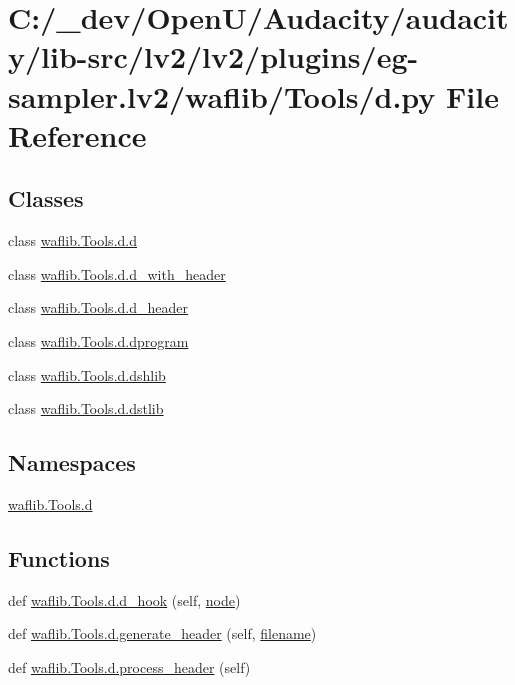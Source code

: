 \hypertarget{lv2_2plugins_2eg-sampler_8lv2_2waflib_2_tools_2d_8py}{}\section{C\+:/\+\_\+dev/\+Open\+U/\+Audacity/audacity/lib-\/src/lv2/lv2/plugins/eg-\/sampler.lv2/waflib/\+Tools/d.py File Reference}
\label{lv2_2plugins_2eg-sampler_8lv2_2waflib_2_tools_2d_8py}
\subsection*{Classes}
\begin{DoxyCompactItemize}
\item 
class \hyperlink{classwaflib_1_1_tools_1_1d_1_1d}{waflib.\+Tools.\+d.\+d}
\item 
class \hyperlink{classwaflib_1_1_tools_1_1d_1_1d__with__header}{waflib.\+Tools.\+d.\+d\+\_\+with\+\_\+header}
\item 
class \hyperlink{classwaflib_1_1_tools_1_1d_1_1d__header}{waflib.\+Tools.\+d.\+d\+\_\+header}
\item 
class \hyperlink{classwaflib_1_1_tools_1_1d_1_1dprogram}{waflib.\+Tools.\+d.\+dprogram}
\item 
class \hyperlink{classwaflib_1_1_tools_1_1d_1_1dshlib}{waflib.\+Tools.\+d.\+dshlib}
\item 
class \hyperlink{classwaflib_1_1_tools_1_1d_1_1dstlib}{waflib.\+Tools.\+d.\+dstlib}
\end{DoxyCompactItemize}
\subsection*{Namespaces}
\begin{DoxyCompactItemize}
\item 
 \hyperlink{namespacewaflib_1_1_tools_1_1d}{waflib.\+Tools.\+d}
\end{DoxyCompactItemize}
\subsection*{Functions}
\begin{DoxyCompactItemize}
\item 
def \hyperlink{namespacewaflib_1_1_tools_1_1d_a0b6f5907fb19962703822b05f5d2c7f6}{waflib.\+Tools.\+d.\+d\+\_\+hook} (self, \hyperlink{structnode}{node})
\item 
def \hyperlink{namespacewaflib_1_1_tools_1_1d_abeab4cb06670217a6a35b8a77933e947}{waflib.\+Tools.\+d.\+generate\+\_\+header} (self, \hyperlink{test__portburn_8cpp_a7efa5e9c7494c7d4586359300221aa5d}{filename})
\item 
def \hyperlink{namespacewaflib_1_1_tools_1_1d_ae7724c426c7d6b03c2f1e81bf03f40a9}{waflib.\+Tools.\+d.\+process\+\_\+header} (self)
\end{DoxyCompactItemize}

